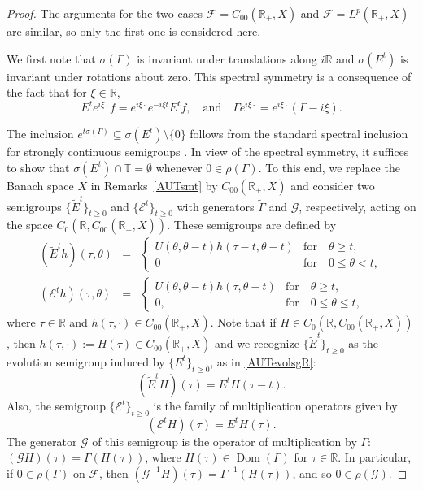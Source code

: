 \documentclass[10pt,psamsfonts,leqno]{siamltex}
\newcommand{\bbR}{\mathbb{R}}
\newcommand{\bbT}{\mathbb{T}}
\newcommand{\Dom}{\operatorname{Dom}}
\newcommand{\lb}{\label}
\newcommand{\Coo}{{C_{00}(\bbR_+,X)}}
\newcommand{\LpRp}{{L^p(\bbR_+,X)}}
\begin{document}
\begin{proof}
The arguments for the two cases $\mathcal{F}=\Coo$ and
$\mathcal{F}=\LpRp$ are similar, so only the first one
is considered here.

We first note that $\sigma(\Gamma)$ is invariant under translations
along $i\bbR$ and $\sigma(E^t)$ is invariant under rotations about
zero.  This spectral symmetry is a consequence of
the fact that  for $\xi\in\bbR$,
\begin{equation}\lb{rescale}
E^t e^{i\xi\cdot}f=e^{i\xi\cdot} e^{-i\xi t}E^t f,
\quad\mbox{and}\quad
\Gamma e^{i\xi\cdot}=e^{i\xi\cdot}(\Gamma-i\xi).
\end{equation}

The inclusion $e^{t\sigma(\Gamma)}\subseteq
\sigma(E^t)\setminus\{0\}$ follows from the standard spectral
inclusion for strongly continuous semigroups \cite{Nagel}.
In view of the spectral symmetry, it suffices to
show that $\sigma(E^t)\cap\bbT=\emptyset$ whenever $0\in\rho(\Gamma)$.
To this end, we replace the Banach space $X$ in
Remarks~\ref{AUTsmt}  by $\Coo$ and consider two semigroups
$\{\tilde{E}^t\}_{t\geq 0}$ and
$\{\mathcal{E}^t\}_{t\geq 0}$ with
generators $\tilde{\Gamma}$ and $\mathcal{G}$,
respectively, acting on the space
$C_0(\bbR,C_{00}(\bbR_+,X))$.  These semigroups are defined by
\begin{eqnarray*}
(\tilde{E}^th)(\tau,\theta)&=& \begin{cases} U(\theta,
\theta-t)h(\tau -t,\theta-t)&\text{for}\quad
\theta \geq t,\\
0 &\text{for}\quad 0\le \theta <t,
\end{cases}\\
(\mathcal{E}^th)(\tau ,\theta)&=&
\begin{cases}
U(\theta ,\theta -t)h(\tau ,\theta -t)
&\text{for}\quad \theta \geq t,
\\ 0 , & \text{for}\quad 0\leq
\theta\le t,
\end{cases}
\end{eqnarray*}
where $\tau \in \bbR$ and $h(\tau ,\cdot )\in C_{00}(\bbR_+, X)$.
Note that if $H\in C_0(\bbR,C_{00}(\bbR_+,X))$, then
$h(\tau,\cdot):=H(\tau)\in C_{00}(\bbR_+,X)$ and we recognize
$\{\tilde{E}^t\}_{t\geq 0}$ as the evolution semigroup induced by
$\{E^t\}_{t\geq 0}$, as in \eqref{AUTevolsgR}:
$$
(\tilde{E}^tH)(\tau )=E^t H(\tau -t).
$$
Also, the semigroup $\{\mathcal{E}^t\}_{t\ge0}$ is the family of
multiplication operators given by
$$
(\mathcal{E} ^tH)(\tau)=E^t H(\tau).
$$
The generator $\mathcal{G}$ of this semigroup is the operator of
multiplication
by $\Gamma$: \
$(\mathcal{G}H)(\tau )=\Gamma(H(\tau ))$,
where $H(\tau )\in \Dom(\Gamma)$ for $\tau \in \bbR$.
In particular, if $0\in \rho(\Gamma)$ on $\mathcal{F}$, then
$(\mathcal{G}^{-1}H)(\tau )=\Gamma^{-1}(H(\tau ))$, and so
$0\in \rho(\mathcal{G})$.


\end{proof}
\end{document}
